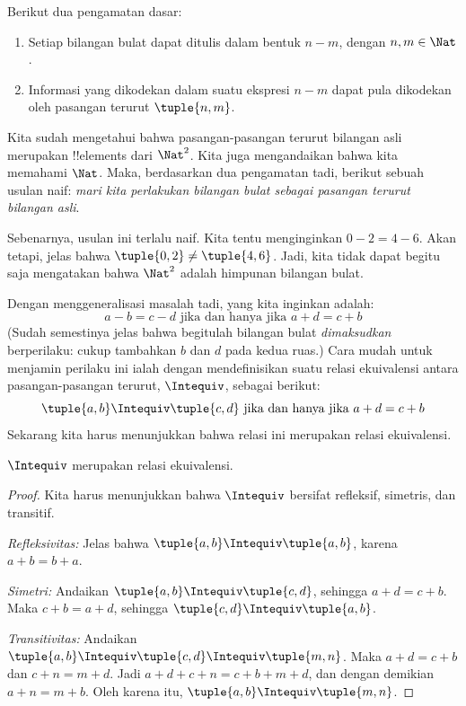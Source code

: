 \documentclass[../../../include/open-logic-section]{subfiles}
\begin{document}

Berikut dua pengamatan dasar:
	\begin{enumerate}
		\item Setiap bilangan bulat dapat ditulis dalam bentuk $n - m$, dengan $n, m \in\Nat$.
		\item Informasi yang dikodekan dalam suatu ekspresi $n - m$ dapat pula dikodekan oleh pasangan terurut $\tuple{n, m}$.
	\end{enumerate}
Kita sudah mengetahui bahwa pasangan-pasangan terurut bilangan asli merupakan !!{element}s dari $\Nat^2$. Kita juga mengandaikan bahwa kita memahami $\Nat$. Maka, berdasarkan dua pengamatan tadi, berikut sebuah usulan naif: \emph{mari kita perlakukan bilangan bulat sebagai pasangan terurut bilangan asli}.

Sebenarnya, usulan ini terlalu naif. Kita tentu menginginkan $0- 2 = 4 - 6$. Akan tetapi, jelas bahwa $\tuple{0, 2 }\neq \tuple{4, 6}$. Jadi, kita tidak dapat begitu saja mengatakan bahwa $\Nat^2$ adalah himpunan bilangan bulat.

Dengan menggeneralisasi masalah tadi, yang kita inginkan adalah:
	$$a - b = c - d \text{ jika dan hanya jika }a + d = c + b$$
(Sudah semestinya jelas bahwa begitulah bilangan bulat \emph{dimaksudkan} berperilaku: cukup tambahkan $b$ dan $d$ pada kedua ruas.) Cara mudah untuk menjamin perilaku ini ialah dengan mendefinisikan suatu relasi ekuivalensi antara pasangan-pasangan terurut, $\Intequiv$, sebagai berikut:
$$\tuple{ a, b } \Intequiv \tuple{c, d}\text{ jika dan hanya jika }a + d = c + b$$
Sekarang kita harus menunjukkan bahwa relasi ini merupakan relasi ekuivalensi.
\begin{prop} $\Intequiv$ merupakan relasi ekuivalensi.
\end{prop}
	\begin{proof}
	Kita harus menunjukkan bahwa $\Intequiv$ bersifat refleksif, simetris, dan transitif.

	\emph{Refleksivitas:} Jelas bahwa $\tuple{a, b} \Intequiv \tuple{a, b}$, karena $a + b = b + a$.

	\emph{Simetri:} Andaikan $\tuple{a, b} \Intequiv \tuple{c, d}$, sehingga $a + d = c + b$. Maka $c + b = a + d$, sehingga $\tuple{c, d} \Intequiv \tuple{a, b}$.

	\emph{Transitivitas:} Andaikan $\tuple{a, b} \Intequiv \tuple{c, d}\Intequiv \tuple{m, n}$. Maka $a + d = c + b$ dan $c + n = m + d$. Jadi $a + d + c + n = c + b + m + d$, dan dengan demikian $a + n = m + b$. Oleh karena itu, $\tuple{a, b } \Intequiv \tuple{m, n}$.
\end{proof}
\end{document}
